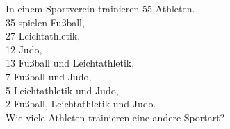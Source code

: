 \begin{aufgabe}[{Klausurvorbereitung 6}]
In einem Sportverein trainieren 55 Athleten.\\
35 spielen Fußball,\\
27 Leichtathletik,\\
12 Judo,\\
13 Fußball und Leichtathletik,\\
7 Fußball und Judo,\\
5 Leichtathletik und Judo,\\
2 Fußball, Leichtathletik und Judo.\\
Wie viele Athleten trainieren eine andere Sportart?
\end{aufgabe}
